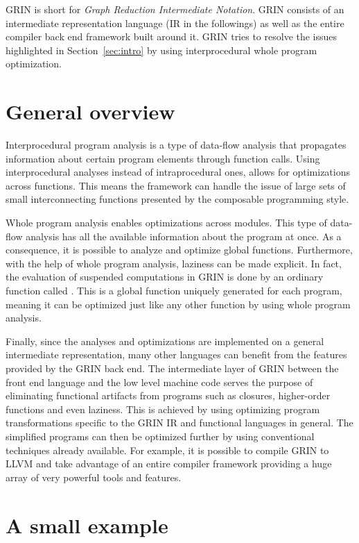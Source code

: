 \documentclass[main.tex]{subfiles}
\begin{document}
	
	GRIN is short for \emph{Graph Reduction Intermediate Notation}. GRIN consists of an intermediate representation language (IR in the followings) as well as the entire compiler back end framework built around it. GRIN tries to resolve the issues highlighted in Section~\ref{sec:intro} by using interprocedural whole program optimization. 
	
	\section{General overview}
	
	Interprocedural program analysis is a type of data-flow analysis that propagates information about certain program elements through function calls. Using interprocedural analyses instead of intraprocedural ones, allows for optimizations across functions. This means the framework can handle the issue of large sets of small interconnecting functions presented by the composable programming style. 
	
	Whole program analysis enables optimizations across modules. This type of data-flow analysis has all the available information about the program at once. As a consequence, it is possible to analyze and optimize global functions. Furthermore, with the help of whole program analysis, laziness can be made explicit. In fact, the evaluation of suspended computations in GRIN is done by an ordinary function called . This is a global function uniquely generated for each program, meaning it can be optimized just like any other function by using whole program analysis. 
	
	Finally, since the analyses and optimizations are implemented on a general intermediate representation, many other languages can benefit from the features provided by the GRIN back end. The intermediate layer of GRIN between the front end language and the low level machine code serves the purpose of eliminating functional artifacts from programs such as closures, higher-order functions and even laziness. This is achieved by using optimizing program transformations specific to the GRIN IR and functional languages in general. The simplified programs can then be optimized further by using conventional techniques already available. For example, it is possible to compile GRIN to LLVM and take advantage of an entire compiler framework providing a huge array of very powerful tools and features.
	
	
	\section{A small example}
	
\end{document}
